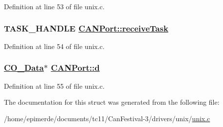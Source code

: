 Definition at line 53 of file unix.c.\hypertarget{structCANPort_c9022d9f15fbff963b1bdb1e914dc871}{
\subsubsection[receiveTask]{\setlength{\rightskip}{0pt plus 5cm}TASK\_\-HANDLE \hyperlink{structCANPort_c9022d9f15fbff963b1bdb1e914dc871}{CANPort::receive\-Task}}}
\label{structCANPort_c9022d9f15fbff963b1bdb1e914dc871}




Definition at line 54 of file unix.c.\hypertarget{structCANPort_45112279ca87924f3ecfc9fdb019cd69}{
\subsubsection[d]{\setlength{\rightskip}{0pt plus 5cm}\hyperlink{structstruct__CO__Data}{CO\_\-Data}$\ast$ \hyperlink{structCANPort_45112279ca87924f3ecfc9fdb019cd69}{CANPort::d}}}
\label{structCANPort_45112279ca87924f3ecfc9fdb019cd69}




Definition at line 55 of file unix.c.

The documentation for this struct was generated from the following file:\begin{CompactItemize}
\item 
/home/epimerde/documents/tc11/Can\-Festival-3/drivers/unix/\hyperlink{unix_8c}{unix.c}\end{CompactItemize}

